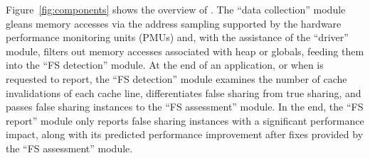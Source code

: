 
%
Figure~\ref{fig:components} shows the overview of \Cheetah{}. 
The ``data collection'' module gleans memory accesses via the address sampling supported by the hardware performance monitoring units (PMUs) and, with the assistance of the ``driver'' module, filters out memory accesses associated with heap or globals, feeding them into the ``FS detection'' module. At the end of an application, or when \cheetah{} is requested to report, the ``FS detection'' module examines the number of cache invalidations of each cache line, differentiates false sharing from true sharing, and passes false sharing instances to the ``FS assessment'' module. In the end, the ``FS report'' module only reports false sharing instances with a significant performance impact, along with its predicted performance improvement after fixes provided by the ``FS assessment'' module. 


